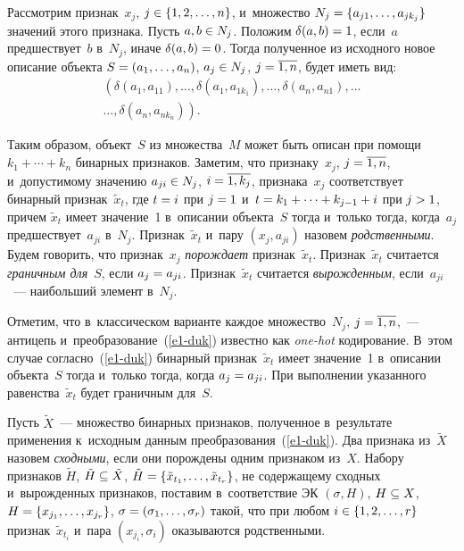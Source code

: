 \begin{multicols}{2}
  Рассмотрим признак~$x_j$, $j\hm\in \{1,2,\ldots , n\}$, и~множество $N_j\hm= 
\{a_{j1},\ldots , a_{jk_j}\}$ значений этого признака. Пусть $a,b\hm\in N_j$. 
Положим $\delta(a,b)\hm=1$, если~$a$ предшествует~$b$ в~$N_j$, иначе 
$\delta(a,b)\hm=0$. Тогда полученное из исходного новое описание объекта 
$S\hm= (a_1, \ldots , a_n)$, $a_j\hm\in N_j$, $j\hm= \overline{1, n}$, будет иметь 
вид:
  \begin{multline}
  \left(\delta(a_1, a_{11}),\ldots,\delta(a_1,a_{1k_1}),\ldots , \delta(a_n,a_{n1}),\ldots\right.\\
\left.  \ldots  , 
\delta(a_n,a_{nk_n})\right).
  \label{e1-duk}
  \end{multline}
  
  Таким образом, объект~$S$ из множества~$M$ может быть описан при 
помощи $k_1+\cdots + k_n$ бинарных признаков. Заметим, что признаку~$x_j$, 
$j\hm= \overline{1, n}$, и~допустимому значению $a_{ji}\hm\in N_j$, 
$i\hm=\overline{1, k_j}$, признака~$x_j$ соответствует бинарный 
признак~$\tilde{x}_t$, где $t\hm= i$ при $j\hm=1$ и~$t\hm= k_1+\cdots + k_{j-
1}+i$ при $j\hm>1$, причем $\tilde{x}_t$ имеет значение~1 в~описании 
объекта~$S$ тогда и~только тогда, когда~$a_j$ предшествует~$a_{ji}$ в~$N_j$. 
Признак~$\tilde{x}_t$ и~пару $(x_j, a_{ji})$ назовем \textit{родственными}. 
Будем говорить, что признак~$x_j$ \textit{порождает} признак~$\tilde{x}_t$. 
Признак~$\tilde{x}_t$ считается \textit{граничным для}~$S$, если $a_j\hm= 
a_{ji}$. Признак~$\tilde{x}_t$ считается \textit{вырожденным}, если~$a_{ji}$~--- наибольший элемент в~$N_j$.
  
  Отметим, что в~классическом варианте каждое множество~$N_j$, 
$j\hm=\overline{1,n}$,~--- антицепь и~преобразование~(\ref{e1-duk}) известно как 
\textit{one-hot} кодирование. В~этом случае согласно~(\ref{e1-duk}) бинарный 
признак~$\tilde{x}_t$ имеет значение~1 в~описании объекта~$S$ тогда и~только 
тогда, когда $a_j\hm= a_{ji}$. При выполнении указанного 
равенства~$\tilde{x}_t$ будет граничным для~$S$. 
  
  Пусть $\tilde{X}$~--- множество бинарных признаков, полученное 
в~результате применения к~исходным данным преобразования~(\ref{e1-duk}). 
Два признака из~$\tilde{X}$ назовем \textit{сходными}, если они порождены 
одним признаком из~$X$. Набору признаков $\tilde{H}$, $\tilde{H}\hm\subseteq 
\tilde{X}$, $\tilde{H}\hm= \{\tilde{x}_{t_1},\ldots , \tilde{x}_{t_r}\}$, не 
содержащему сходных и~вы\-рож\-ден\-ных признаков, поставим в~соответствие ЭК 
$(\sigma, H)$, $H\hm\subseteq X$, $H\hm= \{ x_{j_1}, \ldots , x_{j_r}\}$, 
$\sigma\hm= (\sigma_1, \ldots , \sigma_r)$ такой, что при любом $i\hm\in 
\{1,2,\ldots , r\}$ признак~$\tilde{x}_{t_i}$ и~пара $(x_{j_i}, \sigma_i)$ 
оказываются родственными. 


\end{multicols}
